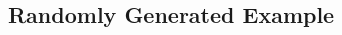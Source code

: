 \documentclass[11pt]{article}
\begin{document}
\begin{multicols}{2}
%
%	
%	
%	
%



\subsection*{Randomly Generated Example}


\end{multicols}
\end{document}
